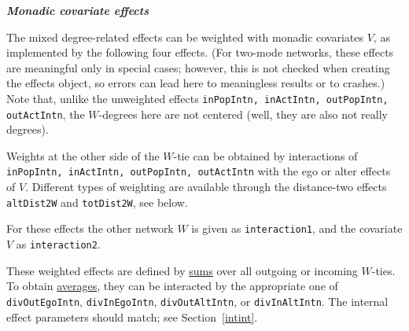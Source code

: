 \documentclass[a4paper,fleqn,11pt]{article}
\newcommand{\+}{\, + \,}
\begin{document}
\fi


\noindent
\textbf{\emph{Monadic covariate effects}}
\medskip

\noindent
The mixed degree-related effects can be weighted with monadic covariates $V$,
as implemented by the following four effects.
(For two-mode networks, these effects are meaningful only in special cases;
however, this is not checked when creating the effects object, so errors
can lead here to meaningless results or to crashes.)
Note that, unlike the unweighted effects
\texttt{inPopIntn, inActIntn, outPopIntn, outActIntn}, the $W$-degrees
here are not centered (well, they are also not really degrees).

Weights at the other side of the $W$-tie can be obtained by interactions of
\texttt{inPopIntn, inActIntn, outPopIntn, outActIntn} with the ego or
alter effects of $V$.
Different types of weighting are available through the distance-two
effects \texttt{altDist2W} and \texttt{totDist2W}, see below.

For these effects the other network $W$ is given as \texttt{interaction1},
and the covariate $V$ as \texttt{interaction2}.

These weighted effects are defined by \underline{sums} over all outgoing
or incoming $W$-ties. To obtain \underline{averages}, they can be interacted
by the appropriate one of  \texttt{divOutEgoIntn}, \texttt{divInEgoIntn},
\texttt{divOutAltIntn}, or \texttt{divInAltIntn}. The internal effect parameters
should match; see Section~\ref{intint}.
\end{document}
